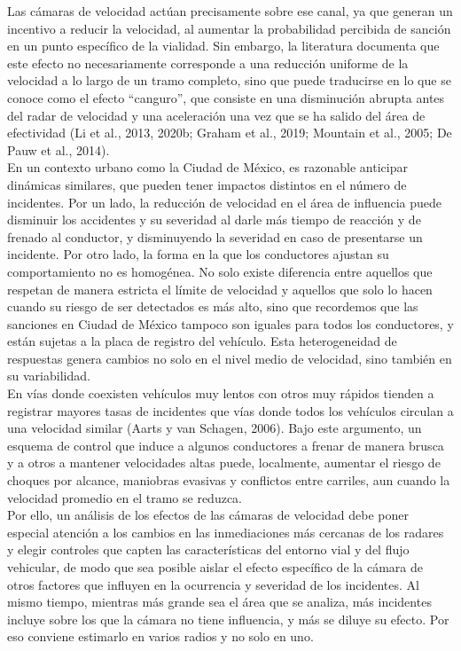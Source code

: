 \indent Las cámaras de velocidad actúan precisamente sobre ese canal, ya que generan un incentivo a reducir la velocidad, al aumentar la probabilidad percibida de sanción en un punto específico de la vialidad. Sin embargo, la literatura documenta que este efecto no necesariamente corresponde a una reducción uniforme de la velocidad a lo largo de un tramo completo, sino que puede traducirse en lo que se conoce como el efecto ``canguro'', que consiste en una disminución abrupta antes del radar de velocidad y una aceleración una vez que se ha salido del área de efectividad (Li et al., 2013, 2020b; Graham et al., 2019; Mountain et al., 2005; De Pauw et al., 2014).\\

En un contexto urbano como la Ciudad de México, es razonable anticipar dinámicas similares, que pueden tener impactos distintos en el número de incidentes. Por un lado, la reducción de velocidad en el área de influencia puede disminuir los accidentes y su severidad al darle más tiempo de reacción y de frenado al conductor, y disminuyendo la severidad en caso de presentarse un incidente. Por otro lado, la forma en la que los conductores ajustan su comportamiento no es homogénea. No solo existe diferencia entre aquellos que respetan de manera estricta el límite de velocidad y aquellos que solo lo hacen cuando su riesgo de ser detectados es más alto, sino que recordemos que las sanciones en Ciudad de México tampoco son iguales para todos los conductores, y están sujetas a la placa de registro del vehículo. Esta heterogeneidad de respuestas genera cambios no solo en el nivel medio de velocidad, sino también en su variabilidad.\\

En vías donde coexisten vehículos muy lentos con otros muy rápidos tienden a registrar mayores tasas de incidentes que vías donde todos los vehículos circulan a una velocidad similar (Aarts y van Schagen, 2006). Bajo este argumento, un esquema de control que induce a algunos conductores a frenar de manera brusca y a otros a mantener velocidades altas puede, localmente, aumentar el riesgo de choques por alcance, maniobras evasivas y conflictos entre carriles, aun cuando la velocidad promedio en el tramo se reduzca.\\ 

Por ello, un análisis de los efectos de las cámaras de velocidad debe poner especial atención a los cambios en las inmediaciones más cercanas de los radares y elegir controles que capten las características del entorno vial y del flujo vehicular, de modo que sea posible aislar el efecto específico de la cámara de otros factores que influyen en la ocurrencia y severidad de los incidentes. Al mismo tiempo, mientras más grande sea el área que se analiza, más incidentes incluye sobre los que la cámara no tiene influencia, y más se diluye su efecto. Por eso conviene estimarlo en varios radios y no solo en uno.\\ 

